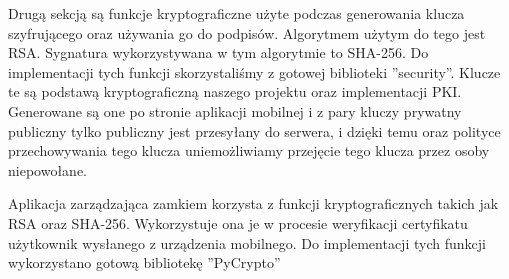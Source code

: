 Drugą sekcją są funkcje kryptograficzne użyte podczas generowania klucza szyfrującego oraz używania go do podpisów. Algorytmem użytym do tego jest RSA. Sygnatura wykorzystywana w tym algorytmie to SHA-256. Do implementacji tych funkcji skorzystaliśmy z gotowej biblioteki ''security''. Klucze te są podstawą kryptograficzną naszego projektu oraz implementacji PKI. Generowane są one po stronie aplikacji mobilnej i z pary kluczy prywatny publiczny tylko publiczny jest przesyłany do serwera, i dzięki temu oraz polityce przechowywania tego klucza uniemożliwiamy przejęcie tego klucza przez osoby niepowołane.

Aplikacja zarządzająca zamkiem korzysta z funkcji kryptograficznych takich jak RSA oraz SHA-256. Wykorzystuje ona je w procesie weryfikacji certyfikatu użytkownik wysłanego z urządzenia mobilnego. Do implementacji tych funkcji wykorzystano gotową bibliotekę ''PyCrypto''

